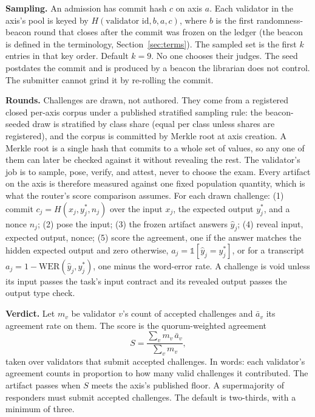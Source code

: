 \documentclass[11pt]{article}
\begin{document}
\textbf{Sampling.} An admission has commit hash $c$ on axis $a$.
Each validator in the axis's pool is keyed by
$H(\text{validator id}, b, a, c)$, where $b$ is the first
randomness-beacon round that closes after the commit was frozen
on the ledger (the beacon is defined in the terminology,
Section~\ref{sec:terms}). The
sampled set
is the first $k$ entries in that key order. Default $k=9$. No one
chooses their judges. The seed postdates the commit and is
produced by a beacon the librarian does not control. The
submitter cannot grind it by re-rolling the commit.

\textbf{Rounds.} Challenges are drawn, not authored. They
come from a registered closed per-axis corpus under a published
stratified sampling rule: the beacon-seeded draw is stratified by
class share (equal per class unless shares are registered), and
the corpus is committed by Merkle root at axis creation. A Merkle
root is a single hash that commits to a whole set of values, so
any one of them can later be checked against it without revealing
the rest. The
validator's job is to sample, pose, verify, and attest, never
to choose the exam. Every artifact on the axis is therefore
measured against one fixed population quantity, which is what the
router's score comparison assumes. For each drawn
challenge: (1) commit
$c_j = H(x_j, y_j^*, n_j)$ over the input $x_j$, the expected
output $y_j^*$, and a nonce $n_j$; (2) pose the input; (3) the
frozen artifact answers $\hat y_j$; (4) reveal input, expected
output, nonce; (5) score the agreement, one if the answer
matches the hidden expected output and zero otherwise,
$a_j = \mathbb{1}[\hat y_j = y_j^*]$, or for a transcript
$a_j = 1 - \mathrm{WER}(\hat y_j, y_j^*)$, one minus the
word-error rate. A challenge is void
unless its input passes the task's input contract and its
revealed output passes the output type check.

\textbf{Verdict.} Let $m_v$ be validator $v$'s count of accepted
challenges and $\bar a_v$ its agreement rate on them. The score
is the quorum-weighted agreement
\begin{equation}
    S = \frac{\sum_{v} m_v \, \bar a_v}{\sum_{v} m_v},
\end{equation}
taken over validators that submit accepted challenges. In
words: each validator's agreement counts in proportion to how
many valid challenges it contributed. The artifact passes when
$S$ meets the axis's published floor. A
supermajority of responders must submit accepted challenges. The
default is two-thirds, with a minimum of three.
\end{document}
